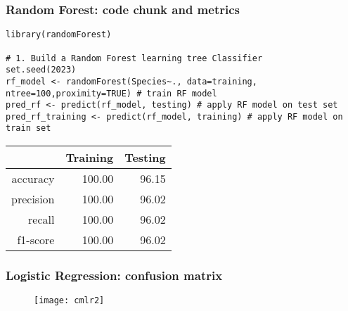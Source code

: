 \documentclass[border=5mm, convert, usenames, dvipsnames,beamer]{standalone}
\begin{document}
\begin{frame}[ fragile]{}
\frametitle{Random Forest: code chunk and metrics}

\vspace{20}
\noindent


\begin{lstlisting}[style=R]
library(randomForest)

# 1. Build a Random Forest learning tree Classifier
set.seed(2023)
rf_model <- randomForest(Species~., data=training, ntree=100,proximity=TRUE) # train RF model
pred_rf <- predict(rf_model, testing) # apply RF model on test set
pred_rf_training <- predict(rf_model, training) # apply RF model on train set
\end{lstlisting}


\begin{table}[ht]
\centering
\begin{tabular}{rrr}
  \hline
 & Training & Testing \\ 
  \hline
accuracy & 100.00 & 96.15 \\ 
  precision & 100.00 & 96.02 \\ 
  recall & 100.00 & 96.02 \\ 
  f1-score & 100.00 & 96.02 \\ 
   \hline
\end{tabular}
\end{table}







\end{frame}


\begin{frame}[ fragile]{}
\frametitle{Logistic Regression: confusion matrix}

\vspace{40}
\noindent

\vspace{-5mm}
\begin{figure}[h!]
\begin{center}
\texttt{[image: cmlr2]}
\end{center}
\end{figure}

\end{frame}
\end{document}
